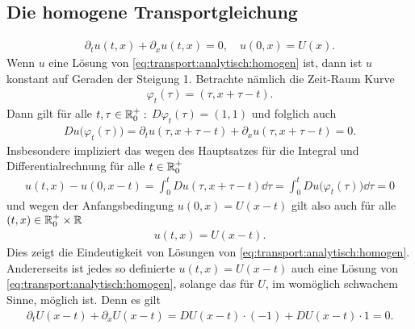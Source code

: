 \subsection*{Die homogene Transportgleichung}
\begin{align}\label{eq:transport:analytisch:homogen}
\partial_t u(t,x) + \partial_x u(t,x) = 0, \quad u(0, x) = U(x).
\end{align}
Wenn $u$ eine Lösung von \eqref{eq:transport:analytisch:homogen} ist, dann ist $u$ konstant auf Geraden der Steigung 1.
Betrachte nämlich die Zeit-Raum Kurve 
\begin{align}\label{eq:transport:analytisch:phi}
\varphi_t(\tau) = (\tau, x+\tau -t).
\end{align}
Dann gilt für alle $t,\tau \in \mathbb R^+_0:$ $D \varphi_t(\tau) = (1, 1)$ und folglich auch
\begin{align}
D u\bigl(\varphi_t(\tau)\bigr) = \partial_t u(\tau, x + \tau - t) + \partial_x u(\tau, x + \tau - t) = 0.
\end{align}
Insbesondere impliziert das wegen des Hauptsatzes für die Integral und Differentialrechnung für alle $t \in \mathbb R^+_0$
\begin{align}
u(t,x) - u(0, x-t) = \int_0^t D u(\tau, x + \tau - t) \dd \tau = \int_0^t D u\bigl( \varphi_t(\tau) \bigr) \dd \tau = 0
\end{align}
und wegen der Anfangsbedingung $u(0,x) = U(x-t)$ gilt also auch für alle $(t, x) \in \mathbb R^+_0 \times \mathbb R$
\begin{align}\label{eq:transport:analytisch:homogen:loesung}u(t,x) = U(x-t).\end{align}
Dies zeigt die Eindeutigkeit von Lösungen von \eqref{eq:transport:analytisch:homogen}.
Andererseits ist jedes so definierte $u(t,x) = U(x-t)$ auch eine Lösung von \eqref{eq:transport:analytisch:homogen}, solange das für $U$, im womöglich schwachem Sinne, möglich ist.
Denn es gilt
\begin{align}
\partial_t U(x-t) + \partial_x U(x-t) = DU(x-t) \cdot (-1) + DU(x-t) \cdot 1 = 0.
\end{align}

